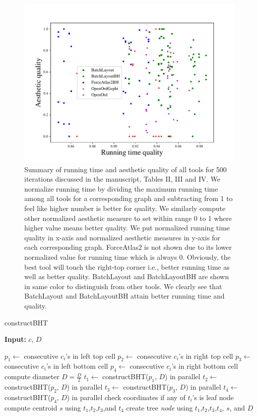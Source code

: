 \documentclass[conference]{article}
\begin{document}
\begin{figure}
    \centering
    \includegraphics[width=0.7\linewidth]{figures/summary50iterations.pdf}
    \caption{Summary of running time and aesthetic quality of all tools for 500 iterations discussed in the manuscript, Tables II, III and IV. We normalize running time by dividing the maximum running time among all tools for a corresponding graph and subtracting from 1 to feel like higher number is better for quality. We similarly compute other normalized aesthetic measure to set within range 0 to 1 where higher value means better quality. We put normalized running time quality in x-axis and normalized aesthetic measures in y-axis for each corresponding graph. ForceAtlas2 is not shown due to its lower normalized value for running time which is always 0. Obviously, the best tool will touch the right-top corner i.e., better running time as well as better quality. BatchLayout and BatchLayoutBH are shown in same color to distinguish from other tools. We clearly see that BatchLayout and BatchLayoutBH attain better running time and quality.}
    \label{fig:summary500iterations}
\end{figure}

\begin{algorithm}
\caption{constructBHT}
\hspace*{\algorithmicindent} \textbf{Input:} $c$, $D$
\begin{algorithmic}[1]
\State $p_1 \leftarrow$ consecutive $c_i$'s in left top cell
\State $p_2 \leftarrow$ consecutive $c_i$'s in right top cell
\State $p_3 \leftarrow$ consecutive $c_i$'s in left bottom cell
\State $p_4 \leftarrow$ consecutive $c_i$'s in right bottom cell
\State compute diameter $D = \frac{D}{2}$
\State $t_1 \leftarrow$ constructBHT($p_1$, $D$) in parallel
\State $t_2 \leftarrow$ constructBHT($p_2$, $D$) in parallel
\State $t_3 \leftarrow$ constructBHT($p_3$, $D$) in parallel
\State $t_4 \leftarrow$ constructBHT($p_4$, $D$) in parallel
\State check coordinates if any of $t_i$'s is leaf node
\State compute centroid $s$ using $t_1$,$t_2$,$t_3$,and $t_4$
\newline
\Return create tree \emph{node} using $t_1$,$t_2$,$t_3$,$t_4$, $s$, and $D$
\end{algorithmic}
\label{algo:constructbht}
\end{algorithm}
\end{document}
